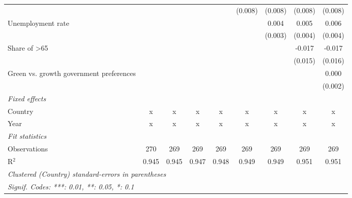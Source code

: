 \begin{table}[htbp]
\begin{tabular}{lcccccccc}
                                                                              &         &         &         &         & (0.008) & (0.008) & (0.008) & (0.008)\\   
      Unemployment rate                                                       &         &         &         &         &         & 0.004   & 0.005   & 0.006\\   
                                                                              &         &         &         &         &         & (0.003) & (0.004) & (0.004)\\   
      Share of >65                                                            &         &         &         &         &         &         & -0.017  & -0.017\\   
                                                                              &         &         &         &         &         &         & (0.015) & (0.016)\\   
      Green vs. growth government preferences                                 &         &         &         &         &         &         &         & 0.000\\   
                                                                              &         &         &         &         &         &         &         & (0.002)\\   
      \emph{Fixed effects}\\
      Country                                                                 & x       & x       & x       & x       & x       & x       & x       & x\\  
      Year                                                                    & x       & x       & x       & x       & x       & x       & x       & x\\  
      \midrule \emph{Fit statistics}\\
      Observations                                                            & 270     & 269     & 269     & 269     & 269     & 269     & 269     & 269\\  
      R$^2$                                                                   & 0.945   & 0.945   & 0.947   & 0.948   & 0.949   & 0.949   & 0.951   & 0.951\\  
      \midrule
      \multicolumn{9}{l}{\emph{Clustered (Country) standard-errors in parentheses}}\\
      \multicolumn{9}{l}{\emph{Signif. Codes: ***: 0.01, **: 0.05, *: 0.1}}\\
   \end{tabular}
\end{table}


